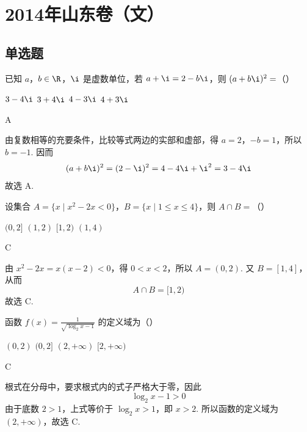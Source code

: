 \chapter{2014年山东卷（文）}

\section{单选题}

\begin{problem}
已知 \(a\)，\(b \in \R\)，\(\i\) 是虚数单位，若 \(a + \i = 2 - b\i\)，则 \((a + b\i)^2 =\)（\quad）

\choices
    {\(3 - 4\i\)}
    {\(3 + 4\i\)}
    {\(4 - 3\i\)}
    {\(4 + 3\i\)}
\end{problem}

\begin{answer}
A
\end{answer}

\begin{solution}
由复数相等的充要条件，比较等式两边的实部和虚部，得 \(a=2\)，\(-b=1\)，所以 \(b=-1\). 因而
\[
(a+b\i)^2=(2-\i)^2=4-4\i+\i^2=3-4\i
\]
故选 A.
\end{solution}

\begin{problem}
设集合 \(A = \{x \mid x^2 - 2x < 0\}\)，\(B = \{x \mid 1 \leqslant x \leqslant 4\}\)，则 \(A \cap B =\)（\quad）

\choices
    {\((0,2]\)}
    {\( (1,2) \)}
    {\([1, 2)\)}
    {\((1,4)\)}
\end{problem}

\begin{answer}
C
\end{answer}

\begin{solution}
由 \(x^2-2x=x(x-2)<0\)，得 \(0<x<2\)，所以 \(A=(0,2)\). 又 \(B=[1,4]\)，从而
\[
A\cap B=[1,2)
\]
故选 C.
\end{solution}

\begin{problem}
函数 \( f(x) = \frac{1}{\sqrt{\log_2 x - 1}} \) 的定义域为（\quad）

\choices
    {\((0,2)\)}
    {\((0,2]\)}
    {\((2, + \infty)\)}
    {\([2, +\infty)\)}
\end{problem}

\begin{answer}
C
\end{answer}

\begin{solution}
根式在分母中，要求根式内的式子严格大于零，因此
\[
\log_2x-1>0
\]
由于底数 \(2>1\)，上式等价于 \(\log_2x>1\)，即 \(x>2\). 所以函数的定义域为 \((2,+\infty)\)，故选 C.
\end{solution}

